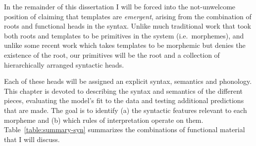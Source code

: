 In the remainder of this dissertation I will be forced into the not-unwelcome position of claiming that templates are \emph{emergent}, arising from the combination of roots and functional heads in the syntax. Unlike much traditional work that took both roots and templates to be primitives in the system (i.e.~morphemes), and unlike some recent work which takes templates to be morphemic but denies the existence of the root, our primitives will be the root and a collection of hierarchically arranged syntactic heads.

Each of these heads will be assigned an explicit syntax, semantics and phonology. This chapter is devoted to describing the syntax and semantics of the different pieces, evaluating the model's fit to the data and testing additional predictions that are made. The goal is to identify (a) the syntactic features relevant to each morpheme and (b) which rules of interpretation operate on them. Table~\ref{table:summary-syn} summarizes the combinations of functional material that I will discuss.

